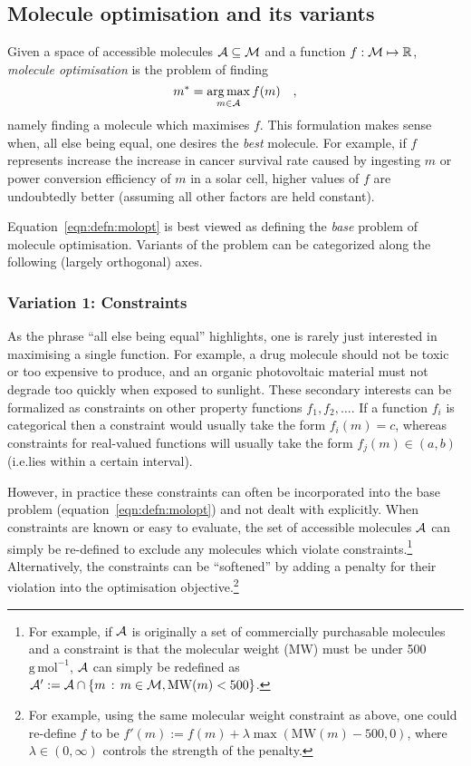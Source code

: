 \subsection{Molecule optimisation and its variants}
\label{sec:background:molopt}

Given a space of accessible molecules $\mathcal{A}\subseteq\mathcal{M}$
and a function $f:\mathcal{M}\mapsto\mathbb{R}$, \emph{molecule optimisation}
is the problem of finding
\begin{equation}\label{eqn:defn:molopt}
    m^* = \operatorname*{arg\,max}_{m\in\mathcal{A}} f(m) \quad,
\end{equation}
namely finding a molecule which maximises $f$.
This formulation makes sense when, all else being equal, one desires the \emph{best} molecule.
For example, if $f$ represents increase the increase in cancer survival rate caused by ingesting $m$
or power conversion efficiency of $m$ in a solar cell,
higher values of $f$ are undoubtedly better (assuming all other factors are held constant).

Equation~\ref{eqn:defn:molopt} is best viewed as defining the \emph{base} problem of molecule optimisation.
Variants of the problem can be categorized along the following (largely orthogonal) axes.

\subsubsection{Variation 1: Constraints}

As the phrase ``all else being equal'' highlights,
one is rarely just interested in maximising a single function.
For example, a drug molecule should not be toxic
or too expensive to produce,
and
an organic photovoltaic material must not degrade too quickly when exposed to sunlight.
These secondary interests can be formalized as constraints
on other property functions $f_1,f_2,\ldots$.
If a function $f_i$ is categorical then a constraint would usually take the form
$f_i(m)=c$,
whereas constraints for real-valued functions will usually take the form
$f_j(m)\in (a, b)$ (i.e.\@ lies within a certain interval).

However, in practice these constraints can often be incorporated into the base problem (equation~\ref{eqn:defn:molopt})
and not dealt with explicitly.
When constraints are known or easy to evaluate,
the set of accessible molecules $\mathcal{A}$ can simply be re-defined to exclude any molecules which violate constraints.\footnote{
For example, if $\mathcal{A}$ is originally a set of commercially purchasable molecules
and a constraint is that the molecular weight (MW) must be under 500 $\mathrm{g\,mol^{-1}}$,
$\mathcal{A}$ can simply be redefined as $\mathcal{A}' := \mathcal{A}\cap\{m\,:\,m\in\mathcal{M},\mathrm{MW}(m)<500\}$.
}
Alternatively, the constraints can be ``softened'' by adding a penalty for their violation
into the optimisation objective.\footnote{
For example, using the same molecular weight constraint as above,
one could re-define $f$ to be $f'(m) := f(m) + \lambda \max(\mathrm{MW}(m)-500, 0)$,
where $\lambda\in(0,\infty)$ controls the strength of the penalty.
}

